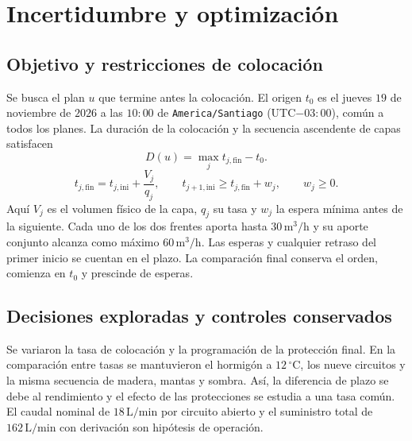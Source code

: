 \section{Incertidumbre y optimización}
\label{sec:incertidumbre-optimizacion}

\subsection{Objetivo y restricciones de colocación}
Se busca el plan $u$ que termine antes la colocación. El origen $t_0$ es el jueves $19$ de noviembre de $2026$ a las $10{:}00$ de \texttt{America/Santiago} (UTC$-03{:}00$), común a todos los planes. La duración de la colocación y la secuencia ascendente de capas satisfacen
\begin{equation}
  D(u)=\max_j t_{j,\mathrm{fin}}-t_0.
  \label{eq:duracion-plan}
\end{equation}
\begin{equation}
  t_{j,\mathrm{fin}}=t_{j,\mathrm{ini}}+\frac{V_j}{q_j},
  \qquad
  t_{j+1,\mathrm{ini}}\geq t_{j,\mathrm{fin}}+w_j,
  \qquad w_j\geq0.
  \label{eq:secuencia-colocacion}
\end{equation}
Aquí $V_j$ es el volumen físico de la capa, $q_j$ su tasa y $w_j$ la espera mínima antes de la siguiente. Cada uno de los dos frentes aporta hasta $30\,\mathrm{m^3/h}$ y su aporte conjunto alcanza como máximo $60\,\mathrm{m^3/h}$. Las esperas y cualquier retraso del primer inicio se cuentan en el plazo. La comparación final conserva el orden, comienza en $t_0$ y prescinde de esperas.

\subsection{Decisiones exploradas y controles conservados}
Se variaron la tasa de colocación y la programación de la protección final. En la comparación entre tasas se mantuvieron el hormigón a $12\,^\circ\mathrm C$, los nueve circuitos y la misma secuencia de madera, mantas y sombra. Así, la diferencia de plazo se debe al rendimiento y el efecto de las protecciones se estudia a una tasa común. El caudal nominal de $18\,\mathrm{L/min}$ por circuito abierto y el suministro total de $162\,\mathrm{L/min}$ con derivación son hipótesis de operación.

